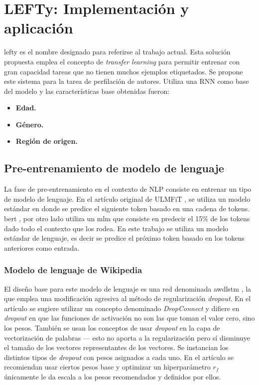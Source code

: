 
\chapter{LEFTy: Implementación y aplicación}

\label{Chapter5} %

\gls{lefty} es el nombre designado para referirse al trabajo actual. Esta solución propuesta emplea el concepto de \textit{transfer learning} para permitir entrenar con gran capacidad tareas que no tienen muchos ejemplos etiquetados. Se propone este sistema para la tarea de perfilación de autores. Utiliza una RNN como base del modelo y las características base obtenidas fueron:

\begin{itemize}
\item \textbf{Edad.}
\item \textbf{Género.}
\item \textbf{Región de origen.}
\end{itemize}

\section{Pre-entrenamiento de modelo de lenguaje}

La fase de pre-entrenamiento en el contexto de NLP consiste en entrenar un tipo de modelo de lenguaje. En el artículo original de ULMFiT \parencite{howard2018}, se utiliza un modelo estándar en donde se predice el siguiente token basado en una cadena de tokens. \gls{bert} \parencite{devlin2018bert}, por otro lado utiliza un \gls{mlm} que consiste en predecir el 15\% de los tokens dado todo el contexto que los rodea. En este trabajo se utiliza un modelo estándar de lenguaje, es decir se predice el próximo token basado en los tokens anteriores como entrada.

\subsection{Modelo de lenguaje de Wikipedia}

El diseño base para este modelo de lenguaje es una red denominada \gls{awdlstm} \parencite{merityRegOpt}, la que emplea una modificación agresiva al método de regularización \textit{dropout}. En el artículo se sugiere utilizar un concepto denominado \textit{DropConnect} y difiere en \textit{dropout} en que las funciones de activación no son las que toman el valor cero, sino los pesos. También se usan los conceptos de usar \textit{dropout} en la capa de vectorización de palabras --- esto no aporta a la regularización pero sí disminuye el tamaño de los vectores representantes de los vectores. Se instancian los distintos tipos de \textit{dropout} con pesos asignados a cada uno. En el artículo se recomiendan usar ciertos pesos base y optimizar un hiperparámetro $r_f$ únicamente le da escala a los pesos recomendados y definidos por ellos.

